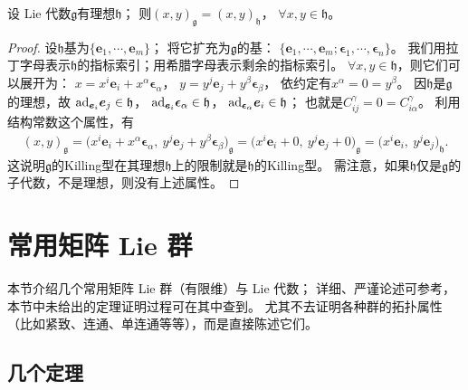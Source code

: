 \begin{proposition}\label{chlg:thm_Killing-gh}
    设 Lie 代数$\mathfrak{g}$有理想$\mathfrak{h}$；
    则$(x,y)_{\mathfrak{g}}=(x,y)_{\mathfrak{h}}$，
    $\forall x,y\in \mathfrak{h} $。
\end{proposition}
\begin{proof}
    设$\mathfrak{h}$基为$\{\boldsymbol{e}_1,\cdots,\boldsymbol{e}_m\}$；
    将它扩充为$\mathfrak{g}$的基：
    $\{\boldsymbol{e}_1,\cdots,\boldsymbol{e}_m;\boldsymbol{\epsilon}_1,\cdots,\boldsymbol{\epsilon}_n\}$。
    我们用拉丁字母表示$\mathfrak{h}$的指标索引；用希腊字母表示剩余的指标索引。
    $\forall x,y \in \mathfrak{h}$，则它们可以展开为：
    $x= x^i \boldsymbol{e}_i + x^\alpha \boldsymbol{\epsilon}_\alpha$，
    $y= y^j \boldsymbol{e}_j + y^\beta \boldsymbol{\epsilon}_\beta$，
    依约定有$x^\alpha=0=y^\beta$。
    因$\mathfrak{h}$是$\mathfrak{g}$的理想，故
    ${\rm ad}_{\boldsymbol{e}_i}\boldsymbol{e}_j \in  \mathfrak{h}$，
    ${\rm ad}_{\boldsymbol{e}_i}\boldsymbol{\epsilon}_\alpha \in  \mathfrak{h}$，
    ${\rm ad}_{\boldsymbol{\epsilon}_\alpha}\boldsymbol{e}_i \in  \mathfrak{h}$；
    也就是$C_{ij}^\gamma=0=C_{i\alpha}^\gamma$。
    利用结构常数这个属性，有
    \begin{align*}
        (x,y)_{\mathfrak{g}}= \bigl(x^i \boldsymbol{e}_i + x^\alpha \boldsymbol{\epsilon}_\alpha,\ 
        y^j \boldsymbol{e}_j + y^\beta \boldsymbol{\epsilon}_\beta\bigr)_{\mathfrak{g}}
        =\bigl(x^i \boldsymbol{e}_i + 0,\ y^j \boldsymbol{e}_j + 0\bigr)_{\mathfrak{g}}
        =\bigl(x^i\boldsymbol{e}_i ,\ y^j\boldsymbol{e}_j \bigr)_{\mathfrak{h}}.
    \end{align*}
    这说明$\mathfrak{g}$的Killing型在其理想$\mathfrak{h}$上的限制就是$\mathfrak{h}$的Killing型。
    需注意，如果$\mathfrak{h}$仅是$\mathfrak{g}$的子代数，不是理想，则没有上述属性。
\end{proof}



\section{常用矩阵 Lie 群}\label{chlg:sec_matrixG-I}
本节介绍几个常用矩阵 Lie 群（有限维）与 Lie 代数；
详细、严谨论述可参考\parencite[Part I]{hall-2015}，  %
本节中未给出的定理证明过程可在其中查到。
尤其不去证明各种群的拓扑属性（比如紧致、连通、单连通等等），而是直接陈述它们。


\subsection{几个定理}

